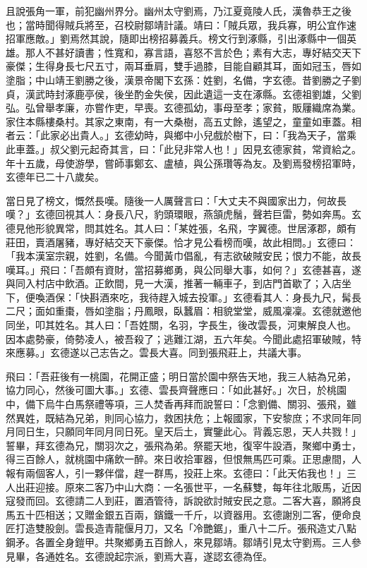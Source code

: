 且說張角一軍，前犯幽州界分。幽州太守劉焉，乃江夏竟陵人氏，漢魯恭王之後也；當時聞得賊兵將至，召校尉鄒靖計議。靖曰：「賊兵眾，我兵寡，明公宜作速招軍應敵。」劉焉然其說，隨即出榜招募義兵。榜文行到涿縣，引出涿縣中一個英雄。那人不甚好讀書；性寬和，寡言語，喜怒不言於色；素有大志，專好結交天下豪傑；生得身長七尺五寸，兩耳垂肩，雙手過膝，目能自顧其耳，面如冠玉，唇如塗脂；中山靖王劉勝之後，漢景帝閣下玄孫：姓劉，名備，字玄德。昔劉勝之子劉貞，漢武時封涿鹿亭侯，後坐酌金失侯，因此遺這一支在涿縣。玄德祖劉雄，父劉弘。弘曾舉孝廉，亦嘗作吏，早喪。玄德孤幼，事母至孝；家貧，販屨織席為業。家住本縣樓桑村。其家之東南，有一大桑樹，高五丈餘，遙望之，童童如車蓋。相者云：「此家必出貴人。」玄德幼時，與鄉中小兒戲於樹下，曰：「我為天子，當乘此車蓋。」叔父劉元起奇其言，曰：「此兒非常人也！」因見玄德家貧，常資給之。年十五歲，母使游學，嘗師事鄭玄、盧植，與公孫瓚等為友。及劉焉發榜招軍時，玄德年已二十八歲矣。

當日見了榜文，慨然長嘆。隨後一人厲聲言曰：「大丈夫不與國家出力，何故長嘆？」玄德回視其人：身長八尺，豹頭環眼，燕頷虎鬚，聲若巨雷，勢如奔馬。玄德見他形貌異常，問其姓名。其人曰：「某姓張，名飛，字翼德。世居涿郡，頗有莊田，賣酒屠豬，專好結交天下豪傑。恰才見公看榜而嘆，故此相問。」玄德曰：「我本漢室宗親，姓劉，名備。今聞黃巾倡亂，有志欲破賊安民；恨力不能，故長嘆耳。」飛曰：「吾頗有資財，當招募鄉勇，與公同舉大事，如何？」玄德甚喜，遂與同入村店中飲酒。正飲間，見一大漢，推著一輛車子，到店門首歇了；入店坐下，便喚酒保：「快斟酒來吃，我待趕入城去投軍。」玄德看其人：身長九尺，髯長二尺；面如重棗，唇如塗脂；丹鳳眼，臥蠶眉：相貌堂堂，威風凜凜。玄德就邀他同坐，叩其姓名。其人曰：「吾姓關，名羽，字長生，後改雲長，河東解良人也。因本處勢豪，倚勢凌人，被吾殺了；逃難江湖，五六年矣。今聞此處招軍破賊，特來應募。」玄德遂以己志告之。雲長大喜。同到張飛莊上，共議大事。

飛曰：「吾莊後有一桃園，花開正盛；明日當於園中祭告天地，我三人結為兄弟，協力同心，然後可圖大事。」玄德、雲長齊聲應曰：「如此甚好。」次日，於桃園中，備下烏牛白馬祭禮等項，三人焚香再拜而說誓曰：「念劉備、關羽、張飛，雖然異姓，既結為兄弟，則同心協力，救困扶危；上報國家，下安黎庶；不求同年同月同日生，只願同年同月同日死。皇天后土，實鑒此心。背義忘恩，天人共戮！」誓畢，拜玄德為兄，關羽次之，張飛為弟。祭罷天地，復宰牛設酒，聚鄉中勇士，得三百餘人，就桃園中痛飲一醉。來日收拾軍器，但恨無馬匹可乘。正思慮間，人報有兩個客人，引一夥伴儅，趕一群馬，投莊上來。玄德曰：「此天佑我也！」三人出莊迎接。原來二客乃中山大商：一名張世平，一名蘇雙，每年往北販馬，近因寇發而回。玄德請二人到莊，置酒管待，訴說欲討賊安民之意。二客大喜，願將良馬五十匹相送；又贈金銀五百兩，鑌鐵一千斤，以資器用。玄德謝別二客，便命良匠打造雙股劍。雲長造青龍偃月刀，又名「冷艷鋸」，重八十二斤。張飛造丈八點鋼矛。各置全身鎧甲。共聚鄉勇五百餘人，來見鄒靖。鄒靖引見太守劉焉。三人參見畢，各通姓名。玄德說起宗派，劉焉大喜，遂認玄德為侄。

